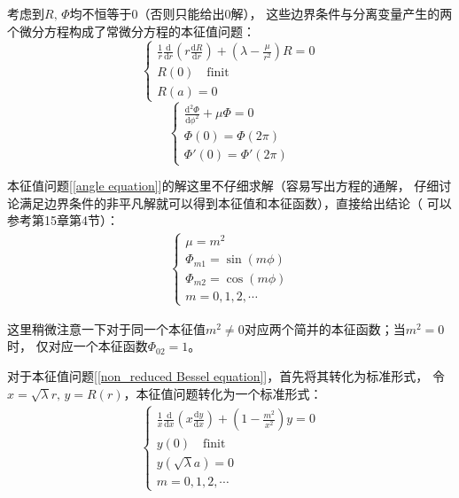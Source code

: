 \documentclass[a4paper]{ctexart}
\def\d{\mathrm{d}}
\newcommand{\mr}[1]{\mathrm{#1}}
\newcommand{\dv}[2]{\frac{\d{#1}}{\d{#2}}}
\begin{document}
	\par 考虑到$R,\, \Phi$均不恒等于0（否则只能给出0解），
	这些边界条件与分离变量产生的两个微分方程构成了常微分方程的本征值问题：
	\begin{equation}
		\left\{ 
			\begin{array}{lr}
				\displaystyle\frac{1}{r}\dv{}{r}\left(r\dv{R}{r} \right) + \left(\lambda - \frac{\mu}{r^2}\right)R = 0\\
				R(0)\quad\mr{finit}\\
				R(a) = 0
			\end{array}
		\right.
		\label{non_reduced Bessel equation}
	\end{equation}
	\begin{equation}
		\left\{ 
			\begin{array}{lr}
				\displaystyle\dv{^2\Phi}{\phi^2} + \mu \Phi = 0\\
				\Phi(0) = \Phi(2\pi)\\
				\Phi'(0) = \Phi'(2\pi)
			\end{array}
		\right.
		\label{angle equation}
	\end{equation}
	\par 本征值问题[\ref{angle equation}]的解这里不仔细求解（容易写出方程的通解，
	仔细讨论满足边界条件的非平凡解就可以得到本征值和本征函数），直接给出结论（
	可以参考\cite{mathematicalmethod}第15章第4节）：
	\begin{align}
		\left\{ 
			\begin{array}{lr}
				\mu = m^{2}\\
				\Phi_{m1} = \sin(m\phi)\\
				\Phi_{m2} = \cos(m\phi)\\
				m = 0,1,2,\cdots 
			\end{array}
		\right.
	\end{align}
	\par 这里稍微注意一下对于同一个本征值$m^2 \neq 0$对应两个简并的本征函数；当$m^2=0$时，
	仅对应一个本征函数$\Phi_{02} = 1$。
	\par 对于本征值问题[\ref{non_reduced Bessel equation}]，首先将其转化为标准形式，
	令$x = \sqrt{\lambda}r,\, y = R(r)$，本征值问题转化为一个标准形式：
	\begin{align}
		\left\{ 
			\begin{array}{lr}
				\displaystyle\frac{1}{x}\dv{}{x}\left(x\dv{y}{x} \right) + \left(1 - \frac{m^2}{x^2}\right)y = 0\\
				y(0)\quad\mr{finit}\\
				y(\sqrt{\lambda}a) = 0\\
				m = 0, 1, 2, \cdots
			\end{array}
		\right.
	\end{align}
\end{document}
